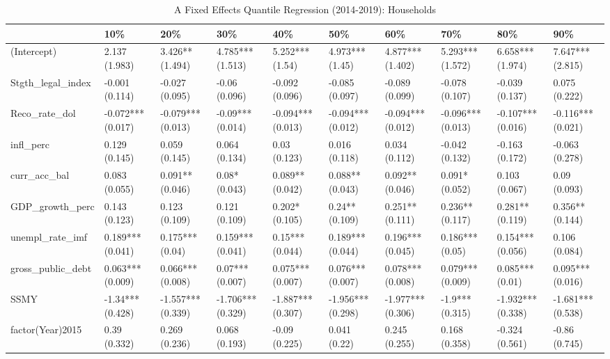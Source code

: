 \begin{table}[ht]
\centering
\caption{A Fixed Effects Quantile Regression (2014-2019): Households} 
\begingroup\small
\begin{tabular}{llllllllll}
  \toprule
 & 10\% & 20\% & 30\% & 40\% & 50\% & 60\% & 70\% & 80\% & 90\% \\ 
  \midrule
(Intercept) & 2.137 (1.983) & 3.426** (1.494) & 4.785*** (1.513) & 5.252*** (1.54) & 4.973*** (1.45) & 4.877*** (1.402) & 5.293*** (1.572) & 6.658*** (1.974) & 7.647*** (2.815) \\ 
  Stgth\_legal\_index & -0.001 (0.114) & -0.027 (0.095) & -0.06 (0.096) & -0.092 (0.096) & -0.085 (0.097) & -0.089 (0.099) & -0.078 (0.107) & -0.039 (0.137) & 0.075 (0.222) \\ 
  Reco\_rate\_dol & -0.072*** (0.017) & -0.079*** (0.013) & -0.09*** (0.014) & -0.094*** (0.013) & -0.094*** (0.012) & -0.094*** (0.012) & -0.096*** (0.013) & -0.107*** (0.016) & -0.116*** (0.021) \\ 
  infl\_perc & 0.129 (0.145) & 0.059 (0.145) & 0.064 (0.134) & 0.03 (0.123) & 0.016 (0.118) & 0.034 (0.112) & -0.042 (0.132) & -0.163 (0.172) & -0.063 (0.278) \\ 
  curr\_acc\_bal & 0.083 (0.055) & 0.091** (0.046) & 0.08* (0.043) & 0.089** (0.042) & 0.088** (0.043) & 0.092** (0.046) & 0.091* (0.052) & 0.103 (0.067) & 0.09 (0.093) \\ 
  GDP\_growth\_perc & 0.143 (0.123) & 0.123 (0.109) & 0.121 (0.109) & 0.202* (0.105) & 0.24** (0.109) & 0.251** (0.111) & 0.236** (0.117) & 0.281** (0.119) & 0.356** (0.144) \\ 
  unempl\_rate\_imf & 0.189*** (0.041) & 0.175*** (0.04) & 0.159*** (0.041) & 0.15*** (0.044) & 0.189*** (0.044) & 0.196*** (0.045) & 0.186*** (0.05) & 0.154*** (0.056) & 0.106 (0.084) \\ 
  gross\_public\_debt & 0.063*** (0.009) & 0.066*** (0.008) & 0.07*** (0.007) & 0.075*** (0.007) & 0.076*** (0.007) & 0.078*** (0.008) & 0.079*** (0.009) & 0.085*** (0.01) & 0.095*** (0.016) \\ 
  SSMY & -1.34*** (0.428) & -1.557*** (0.339) & -1.706*** (0.329) & -1.887*** (0.307) & -1.956*** (0.298) & -1.977*** (0.306) & -1.9*** (0.315) & -1.932*** (0.338) & -1.681*** (0.538) \\ 
  factor(Year)2015 & 0.39 (0.332) & 0.269 (0.236) & 0.068 (0.193) & -0.09 (0.225) & 0.041 (0.22) & 0.245 (0.255) & 0.168 (0.358) & -0.324 (0.561) & -0.86 (0.745) \\ 

\end{tabular}
\end{table}
